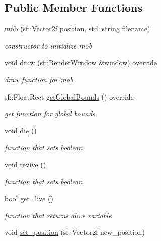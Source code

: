 \subsection*{Public Member Functions}
\begin{DoxyCompactItemize}
\item 
\hyperlink{classmob_ac524dd40986df00721239b66c552437e}{mob} (sf\+::\+Vector2f \hyperlink{classdrawable_a34679fa5ae82eee65dfd6b1b9f3c7cb6}{position}, std\+::string filename)
\begin{DoxyCompactList}\small\item\em constructor to initialize mob \end{DoxyCompactList}\item 
void \hyperlink{classmob_a52f5e29b2ac2d87c8c1be7e0ff5ec96b}{draw} (sf\+::\+Render\+Window \&window) override
\begin{DoxyCompactList}\small\item\em draw function for mob \end{DoxyCompactList}\item 
sf\+::\+Float\+Rect \hyperlink{classmob_af3859378fad2a5f93a1c4d833ff74d5d}{get\+Global\+Bounds} () override
\begin{DoxyCompactList}\small\item\em get function for global bounds \end{DoxyCompactList}\item 
void \hyperlink{classmob_ae892b3ce84f4aa16411b385abb5410c8}{die} ()
\begin{DoxyCompactList}\small\item\em function that sets boolean \end{DoxyCompactList}\item 
void \hyperlink{classmob_a3bce6c06653881f8be86fbc60a2b67cb}{revive} ()
\begin{DoxyCompactList}\small\item\em function that sets boolean \end{DoxyCompactList}\item 
bool \hyperlink{classmob_ab327a1798c02be3f9db7c1d01b17ba02}{get\+\_\+live} ()
\begin{DoxyCompactList}\small\item\em function that returns alive variable \end{DoxyCompactList}\item 
void \hyperlink{classmob_a6556e84e416fd496450d18dd1d0eb1f2}{set\+\_\+position} (sf\+::\+Vector2f new\+\_\+position)
\end{DoxyCompactItemize}

